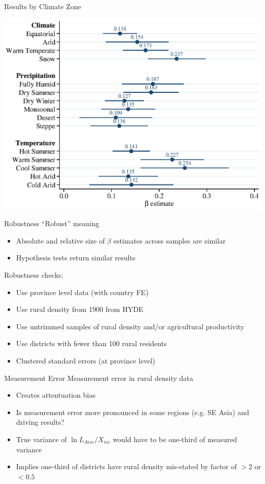 \documentclass[10pt, xcolor=dvipsnames]{beamer}
\begin{document}
\begin{frame}{Results by Climate Zone}
\begin{center}
\includegraphics[width=.8\textwidth]{fig_coef_kg.eps}
\end{center}
\end{frame}

\begin{frame}{Robustness}\label{robustness}
``Robust'' meaning
\begin{itemize}
  \item Absolute and relative size of $\beta$ estimates across samples are similar
  \item Hypothesis tests return similar results
\end{itemize}
Robustness checks:
\begin{itemize}
  \item Use province level data (with country FE) \hyperlink{regprov}{}
  \item Use rural density from 1900 from HYDE \hyperlink{reg1900}{}
  \item Use untrimmed samples of rural density and/or agricultural productivity
  \item Use districts with fewer than 100 rural residents
  \item Clustered standard errors (at province level)
\end{itemize}
\end{frame}

\begin{frame}{Measurement Error}
Measurement error in rural density data
\begin{itemize}
  \item Creates attentuation bias
  \item Is measurement error more pronounced in some regions (e.g. SE Asia) and driving results?
  \item True variance of $\ln L_{Aisc}/X_{isc}$ would have to be one-third of measured variance
  \item Implies one-third of districts have rural density mis-stated by factor of $>2$ or $<0.5$
\end{itemize}
\end{frame}
\end{document}
